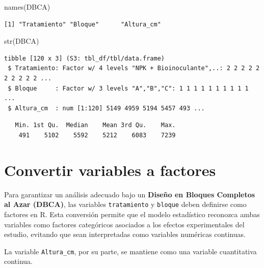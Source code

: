 \documentclass[
  spanish,
  letterpaper,
  DIV=11,
  numbers=noendperiod]{scrreprt}
\newenvironment{Shaded}{\begin{snugshade}}{\end{snugshade}}
\newcommand{\FunctionTok}[1]{\textcolor[rgb]{0.28,0.35,0.67}{#1}}
\newcommand{\NormalTok}[1]{\textcolor[rgb]{0.00,0.23,0.31}{#1}}
\newcommand{\SpecialCharTok}[1]{\textcolor[rgb]{0.37,0.37,0.37}{#1}}
\begin{document}
\begin{Shaded}
\begin{Highlighting}[]
\FunctionTok{names}\NormalTok{(DBCA)}
\end{Highlighting}
\end{Shaded}

\begin{verbatim}
[1] "Tratamiento" "Bloque"      "Altura_cm"  
\end{verbatim}

\begin{Shaded}
\begin{Highlighting}[]
\FunctionTok{str}\NormalTok{(DBCA)}
\end{Highlighting}
\end{Shaded}

\begin{verbatim}
tibble [120 x 3] (S3: tbl_df/tbl/data.frame)
 $ Tratamiento: Factor w/ 4 levels "NPK + Bioinoculante",..: 2 2 2 2 2 2 2 2 2 2 ...
 $ Bloque     : Factor w/ 3 levels "A","B","C": 1 1 1 1 1 1 1 1 1 1 ...
 $ Altura_cm  : num [1:120] 5149 4959 5194 5457 493 ...
\end{verbatim}

\begin{Shaded}
\end{Shaded}

\begin{verbatim}
   Min. 1st Qu.  Median    Mean 3rd Qu.    Max. 
    491    5102    5592    5212    6083    7239 
\end{verbatim}

\section{Convertir variables a
factores}\label{convertir-variables-a-factores}

Para garantizar un análisis adecuado bajo un \textbf{Diseño en Bloques
Completos al Azar (DBCA)}, las variables \texttt{tratamiento} y
\texttt{bloque} deben definirse como factores en R. Esta conversión
permite que el modelo estadístico reconozca ambas variables como
factores categóricos asociados a los efectos experimentales del estudio,
evitando que sean interpretadas como variables numéricas continuas.

La variable \texttt{Altura\_cm}, por su parte, se mantiene como una
variable cuantitativa continua.
\end{document}

